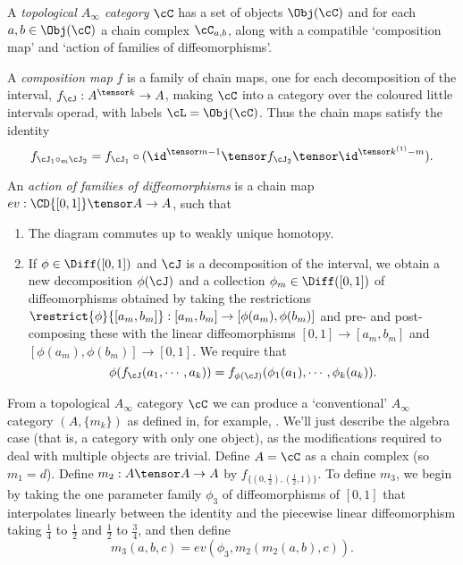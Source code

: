 \begin{defn}
A \emph{topological $A_\infty$ category} $\cC$ has a set of objects $\Obj(\cC)$ and for each $a,b \in \Obj(\cC)$ a chain complex $\cC_{a,b}$, along with a compatible `composition map' and `action of families of diffeomorphisms'.

A \emph{composition map} $f$ is a family of chain maps, one for each decomposition of the interval, $f_\cJ : A^{\tensor k} \to A$, making $\cC$ into a category over the coloured little intervals operad, with labels $\cL = \Obj(\cC)$. Thus the chain maps satisfy the identity 
\begin{equation*}
f_{\cJ_1 \circ_m \cJ_2} = f_{\cJ_1} \circ (\id^{\tensor m-1} \tensor f_{\cJ_2} \tensor \id^{\tensor k^{(1)} - m}).
\end{equation*}

An \emph{action of families of diffeomorphisms} is a chain map $ev: \CD{[0,1]} \tensor A \to A$, such that  
\begin{enumerate}
\item The diagram 
\todo{}
commutes up to weakly unique  homotopy.
\item If $\phi \in \Diff([0,1])$ and $\cJ$ is a decomposition of the interval, we obtain a new decomposition $\phi(\cJ)$ and a collection $\phi_m \in \Diff([0,1])$ of diffeomorphisms obtained by taking the restrictions $\restrict{\phi}{[a_m,b_m]} : [a_m,b_m] \to [\phi(a_m),\phi(b_m)]$ and pre- and post-composing these with the linear diffeomorphisms $[0,1] \to [a_m,b_m]$ and $[\phi(a_m),\phi(b_m)] \to [0,1]$. We require that
\begin{equation*}
\phi(f_\cJ(a_1, \cdots, a_k)) = f_{\phi(\cJ)}(\phi_1(a_1), \cdots, \phi_k(a_k)).
\end{equation*}
\end{enumerate}
\end{defn}

From a topological $A_\infty$ category $\cC$ we can produce a `conventional' $A_\infty$ category $(A, \{m_k\})$ as defined in, for example, \cite{MR1854636}. We'll just describe the algebra case (that is, a category with only one object), as the modifications required to deal with multiple objects are trivial. Define $A = \cC$ as a chain complex (so $m_1 = d$). Define $m_2 : A\tensor A \to A$ by $f_{\{(0,\frac{1}{2}),(\frac{1}{2},1)\}}$. To define $m_3$, we begin by taking the one parameter family $\phi_3$ of diffeomorphisms of $[0,1]$ that interpolates linearly between the identity and the piecewise linear diffeomorphism taking $\frac{1}{4}$ to $\frac{1}{2}$ and $\frac{1}{2}$ to $\frac{3}{4}$, and then define
\begin{equation*}
m_3(a,b,c) = ev(\phi_3, m_2(m_2(a,b), c)).
\end{equation*}

